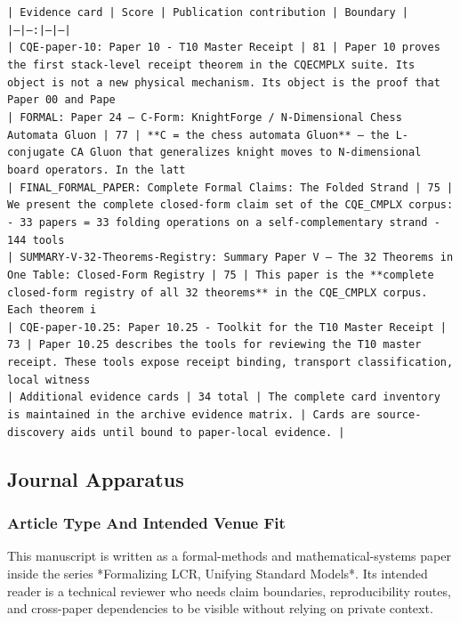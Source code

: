 \documentclass[11pt]{article}
\begin{document}
\noindent\texttt{| Evidence card | Score | Publication contribution | Boundary |}\\
\noindent\texttt{|---|---:|---|---|}\\
\noindent\texttt{| CQE-paper-10: Paper 10 - T10 Master Receipt | 81 | Paper 10 proves the first stack-level receipt theorem in the CQECMPLX suite. Its object is not a new physical mechanism. Its object is the proof that Paper 00 and Pape}\\
\noindent\texttt{| FORMAL: Paper 24 — C-Form: KnightForge / N-Dimensional Chess Automata Gluon | 77 | **C = the chess automata Gluon** — the L-conjugate CA Gluon that generalizes knight moves to N-dimensional board operators. In the latt}\\
\noindent\texttt{| FINAL\_FORMAL\_PAPER: Complete Formal Claims: The Folded Strand | 75 | We present the complete closed-form claim set of the CQE\_CMPLX corpus: - 33 papers = 33 folding operations on a self-complementary strand - 144 tools}\\
\noindent\texttt{| SUMMARY-V-32-Theorems-Registry: Summary Paper V — The 32 Theorems in One Table: Closed-Form Registry | 75 | This paper is the **complete closed-form registry of all 32 theorems** in the CQE\_CMPLX corpus. Each theorem i}\\
\noindent\texttt{| CQE-paper-10.25: Paper 10.25 - Toolkit for the T10 Master Receipt | 73 | Paper 10.25 describes the tools for reviewing the T10 master receipt. These tools expose receipt binding, transport classification, local witness}\\
\noindent\texttt{| Additional evidence cards | 34 total | The complete card inventory is maintained in the archive evidence matrix. | Cards are source-discovery aids until bound to paper-local evidence. |}\\

\subsection*{Journal Apparatus}

\subsubsection*{Article Type And Intended Venue Fit}

This manuscript is written as a formal-methods and mathematical-systems paper
inside the series *Formalizing LCR, Unifying Standard Models*. Its intended
reader is a technical reviewer who needs claim boundaries, reproducibility
routes, and cross-paper dependencies to be visible without relying on private
context.
\end{document}
